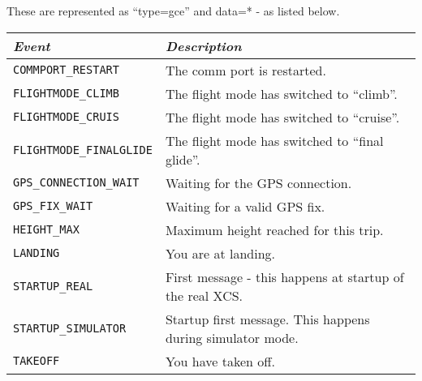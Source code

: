 These are represented as ``type=gce'' and data=* - as listed below.

{\footnotesize
\begin{tabular}{l|p{5.6cm}}
\emph{Event} & \emph{Description} \\
\hline

\verb|COMMPORT_RESTART| & The comm port is restarted. \\

\hline

\verb|FLIGHTMODE_CLIMB| & The flight mode has switched to ``climb''. \\

\hline

\verb|FLIGHTMODE_CRUIS| & The flight mode has switched to ``cruise''. \\

\hline

\verb|FLIGHTMODE_FINALGLIDE| & The flight mode has switched to ``final
glide''. \\

\hline

\verb|GPS_CONNECTION_WAIT| & Waiting for the GPS connection. \\

\hline

\verb|GPS_FIX_WAIT| & Waiting for a valid GPS fix. \\

\hline

\verb|HEIGHT_MAX| & Maximum height reached for this trip. \\

\hline

\verb|LANDING| & You are at landing. \\

\hline

\verb|STARTUP_REAL| & First message - this happens at startup of the
real XCS. \\

\hline

\verb|STARTUP_SIMULATOR| & Startup first message. This happens during
simulator mode. \\

\hline

\verb|TAKEOFF| & You have taken off. \\

\end{tabular}}

